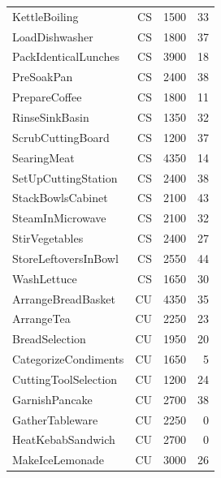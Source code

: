 \documentclass[10pt,twocolumn,letterpaper]{article}
\begin{document}
\begin{longtable}{@{}p{}rrr@{}}
KettleBoiling & CS & 1500 & 33\\

LoadDishwasher & CS & 1800 & 37\\

PackIdenticalLunches & CS & 3900 & 18\\

PreSoakPan & CS & 2400 & 38\\

PrepareCoffee & CS & 1800 & 11\\

RinseSinkBasin & CS & 1350 & 32\\

ScrubCuttingBoard & CS & 1200 & 37\\

SearingMeat & CS & 4350 & 14\\

SetUpCuttingStation & CS & 2400 & 38\\

StackBowlsCabinet & CS & 2100 & 43\\

SteamInMicrowave & CS & 2100 & 32\\

StirVegetables & CS & 2400 & 27\\

StoreLeftoversInBowl & CS & 2550 & 44\\

WashLettuce & CS & 1650 & 30\\

ArrangeBreadBasket & CU & 4350 & 35\\

ArrangeTea & CU & 2250 & 23\\

BreadSelection & CU & 1950 & 20\\

CategorizeCondiments & CU & 1650 & 5\\

CuttingToolSelection & CU & 1200 & 24\\

GarnishPancake & CU & 2700 & 38\\

GatherTableware & CU & 2250 & 0\\

HeatKebabSandwich & CU & 2700 & 0\\

MakeIceLemonade & CU & 3000 & 26\\


\end{longtable}
\end{document}

